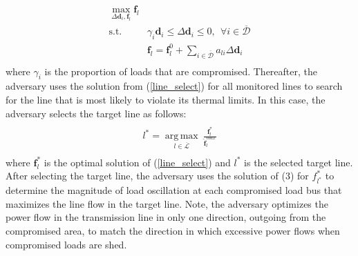 \documentclass[journal]{IEEEtran}
\begin{document}
\begin{equation}
\label{line_select}
\begin{aligned}
\max_{\Delta \mathbf{d}_i, \mathbf{f}_l}  \mathbf{f}_l\\
\textrm{s.t.} \quad & \gamma_i  \mathbf{d}_i \leq \Delta \mathbf{d}_i \leq 0,~~ \forall i \in \mathcal{\overline{D}}\\
\quad & \mathbf{f}_l = \mathbf{f}_l^0+\sum_{i\in \mathcal{\overline{D}}}{a_{li} \Delta \mathbf{d}_i}\\
\end{aligned}
\end{equation}
where $\gamma_i$ is the proportion of loads that are compromised. Thereafter, the adversary uses the solution from (\ref{line_select}) for all monitored lines to search for the line that is most likely to violate its thermal limits. %
In this case, the adversary selects the target line as follows:
\begin{equation}
\label{opti_line_select}
\begin{aligned}
\\
l^*= \operatorname*{arg\,max}_{l \in \mathcal{\overline{L}}} ~\frac{\mathbf{f}_l^{*}}{\mathbf{\hat{f}}_{l}^{max} }      \\
\end{aligned}
\end{equation}
where $\mathbf{f}_l^{*}$ is the optimal solution of (\ref{line_select}) and $l^*$ is the selected target line. After selecting the target line, the adversary uses the solution of (3) for $f^*_{l^*}$  to determine the magnitude of load oscillation at each compromised load bus that maximizes the line flow in the target line. 
Note, the adversary optimizes the power flow in the transmission line in only one direction, outgoing from the compromised area, to match the direction in which excessive power flows when compromised loads are shed.
\end{document}
